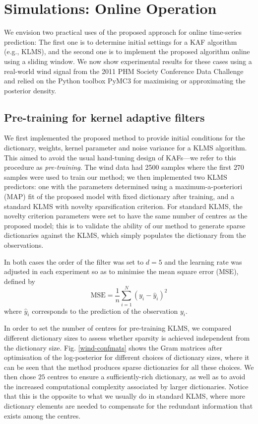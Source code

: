 
\section{Simulations: Online Operation}

We envision two practical uses of the proposed approach for online time-series prediction: The first one is to determine initial settings for a KAF algorithm (e.g., KLMS), and the second one is to implement the proposed algorithm online using a sliding window. We now show experimental results for these cases using a real-world wind signal from the 2011 PHM Society Conference Data Challenge \cite{windref} and relied on the Python toolbox PyMC3 for maximising or approximating the posterior density.

\subsection{Pre-training for kernel adaptive filters}

We first implemented the proposed method to provide initial conditions for the dictionary, weights, kernel parameter and noise variance for a KLMS algorithm. This aimed to avoid the usual hand-tuning design of KAFs---we refer to this procedure as \emph{pre-training}. The wind data had 2500 samples where the first $270$ samples were used to train our method; we then implemented two KLMS predictors: one with the parameters determined using a maximum-a-posteriori (MAP) fit of the proposed model with fixed dictionary after training, and a standard KLMS with novelty sparsification criterion. For standard KLMS, the novelty criterion parameters were set to have the same number of centres as the proposed model; this is to validate the ability of our method to generate sparse dictionaries against the KLMS, which simply populates the dictionary from the observations.

In both cases the order of the filter was set to $d=5$ and the learning rate was adjusted in each experiment so as to minimise the mean square error (MSE), defined by
\begin{equation*}
\text{MSE} = \frac{1}{n}\sum_{i=1}^{N}\left(y_i - \hat{y}_i\right)^2
\end{equation*}
where $\hat{y}_i$ corresponds to the prediction of the observation $y_i$. 

In order to set the number of centres for pre-training KLMS, we compared different dictionary sizes to assess whether sparsity is achieved independent from the dictionary size. Fig. \ref{wind-confmats} shows the Gram matrices after optimisation of the log-posterior for different choices of dictionary sizes, where it can be seen that the method produces sparse dictionaries for all these choices. We then chose $25$ centres to ensure a sufficiently-rich dictionary, as well as to avoid the increased computational complexity associated by larger dictionaries. Notice that this is the opposite to what we usually do in standard KLMS, where more dictionary elements are needed to compensate for the redundant information that exists among the centres.

